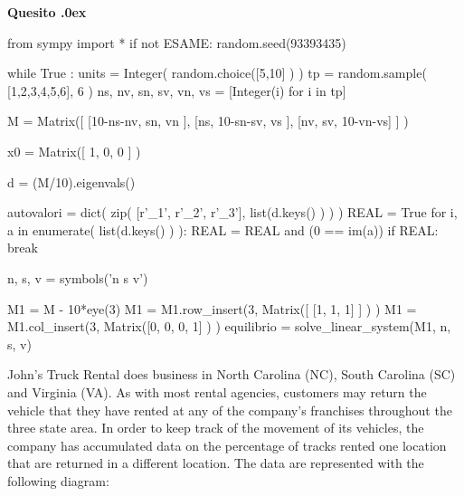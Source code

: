 \documentclass[11pt,twoside,a4paper]{article}
\newcounter{quesito}
\newenvironment{question}{\bigskip\addtocounter{quesito}{1}\bigskip\bigskip\par\textbf{Quesito \thequesito.\kern0ex}}{\par\vspace{\parskip}}
\begin{document}
\clearpage
\begin{question}
\def\Pr{{\rm Pr\,}}
\def\pyl#1{\py{latex(#1) } }
\everymath{\displaystyle}
\def\nicefrac#1#2{#1/#2}
\renewcommand{\arraystretch}{1.3}
\begin{pycode}
from sympy import *
if not ESAME: random.seed(93393435)

while True :
    units = Integer( random.choice([5,10] ) )
    tp  =  random.sample( [1,2,3,4,5,6], 6 ) 
    ns, nv, sn, sv, vn, vs = [Integer(i) for i in tp] 

    M = Matrix([ [10-ns-nv, sn,        vn       ],
                [ns,         10-sn-sv, vs       ],
                [nv,         sv,        10-vn-vs] ] )

    x0 = Matrix([ 1, 0, 0 ] )

    d = (M/10).eigenvals()

    autovalori = dict( zip( [r'\lambda_1', r'\lambda_2', r'\lambda_3'], 
                           list(d.keys() ) ) )
    REAL = True
    for i, a in enumerate( list(d.keys() ) ):
        REAL = REAL and (0 == im(a))
    if REAL: break

n, s, v = symbols('n s v')

M1 = M - 10*eye(3)
M1 = M1.row_insert(3, Matrix([ [1, 1, 1] ] ) )
M1 = M1.col_insert(3, Matrix([0, 0, 0, 1] ) )
equilibrio = solve_linear_system(M1, n, s, v)

\end{pycode}
John’s Truck Rental does business in North Carolina ({\sf NC}), South Carolina ({\sf SC}) and Virginia ({\sf VA}). As with most rental agencies, customers may return the vehicle that they have rented at any of the company’s franchises throughout the three state area. In order to keep track of the movement of its vehicles, the company has accumulated data on the percentage of tracks rented one location that are  returned in a different location. The data are represented with the following diagram:

\hfil
{}
\end{question}
\end{document}
